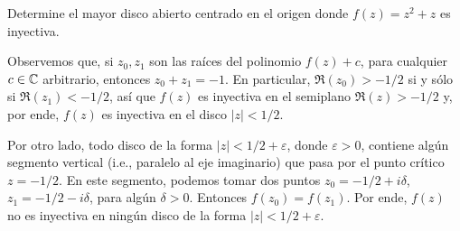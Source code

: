 \begin{exercise}
Determine el mayor disco abierto centrado en el origen donde $f(z) = z^2 + z$ es inyectiva.
\end{exercise}

\begin{solution}
Observemos que, si $z_0, z_1$ son las raíces del polinomio $f(z) + c$, para cualquier $c \in \mathbb C$ arbitrario, entonces $z_0 + z_1 = -1$. En particular, $\Re(z_0) > -1/2$ si y sólo si $\Re(z_1) < -1/2$, así que $f(z)$ es inyectiva en el semiplano $\Re(z) > -1/2$ y, por ende, $f(z)$ es inyectiva en el disco $|z| < 1/2$.

Por otro lado, todo disco de la forma $|z| < 1/2 + \varepsilon$, donde $\varepsilon > 0$, contiene algún segmento vertical (i.e., paralelo al eje imaginario) que pasa por el punto crítico $z = -1/2$. En este segmento, podemos tomar dos puntos $z_0 = -1/2 + i\delta$, $z_1 = -1/2 - i\delta$, para algún $\delta > 0$. Entonces $f(z_0) = f(z_1)$. Por ende, $f(z)$ no es inyectiva en ningún disco de la forma $|z| < 1/2 + \varepsilon$.
\end{solution}

